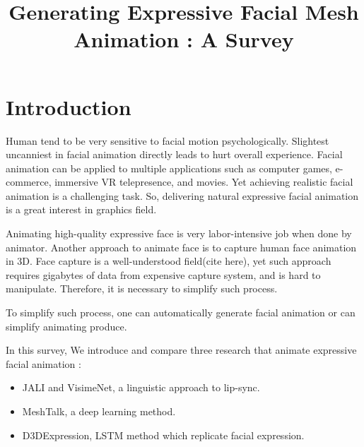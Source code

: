 \documentclass[10pt,twocolumn,letterpaper]{article}
\begin{document}
\title{Generating Expressive Facial Mesh Animation : A Survey}

\author{
{\tt\small}
}
\maketitle


\section{Introduction}
\label{sec:intro}

Human tend to be very sensitive to facial motion psychologically. Slightest uncanniest in facial animation directly leads to hurt overall experience\cite{hansonUpendingUncannyValley}. Facial animation can be applied to multiple applications such as computer games, e-commerce, immersive VR telepresence, and movies. Yet achieving realistic facial animation is a challenging task. So, delivering natural expressive facial animation is a great interest in graphics field.

Animating high-quality expressive face is very labor-intensive job when done by animator. Another approach to animate face is to capture human face animation in 3D. Face capture is a well-understood field(cite here), yet such approach requires gigabytes of data from expensive capture system, and is hard to manipulate. Therefore, it is necessary to simplify such process. 

To simplify such process, one can automatically generate facial animation or can simplify animating produce.

In this survey, We introduce and compare three research that animate expressive facial animation :
\begin{itemize}
 \item JALI\cite{edwardsJALIAnimatorcentricViseme2016} and VisimeNet\cite{zhouVisemenetAudiodrivenAnimatorcentric2018}, a linguistic approach to lip-sync.
 \item MeshTalk\cite{richardMeshTalk3DFace2021}, a deep learning method.
 \item D3DExpression\cite{potamiasLearningGenerateCustomized2020}, LSTM method which replicate facial expression.
\end{itemize}
\end{document}
